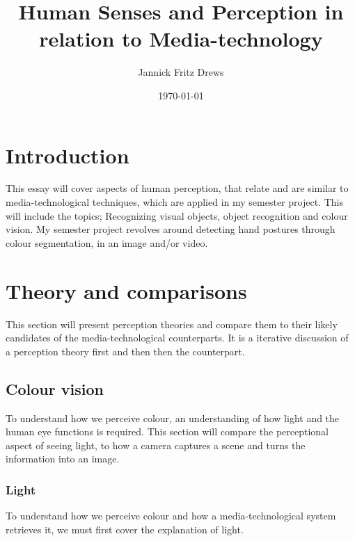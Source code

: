 \documentclass{article}
\title{Human Senses and Perception in relation to Media-technology}
\author{Jannick Fritz Drews}
\date{\today}
\begin{document}
\maketitle
\thispagestyle{empty} %
\newpage %


\section{Introduction}
\label{sec:Introduction}
This essay will cover aspects of human perception, that relate and are similar to media-technological techniques, which are applied in my semester project. This will include the topics; Recognizing visual objects, object recognition and colour vision. My semester project revolves around detecting hand postures through colour segmentation, in an image and/or video.
\section{Theory and comparisons}
\label{sec:Theory}
This section will present perception theories and compare them to their likely candidates of the media-technological counterparts. It is a iterative discussion of a perception theory first and then then the counterpart.

\subsection{Colour vision} %
To understand how we perceive colour, an understanding of how light and the human eye functions is required. This section will compare the perceptional aspect of seeing light, to how a camera captures a scene and turns the information into an image.

\subsubsection{Light}
To understand how we perceive colour and how a media-technological system retrieves it, we must first cover the explanation of light.\medskip\\
\end{document}

